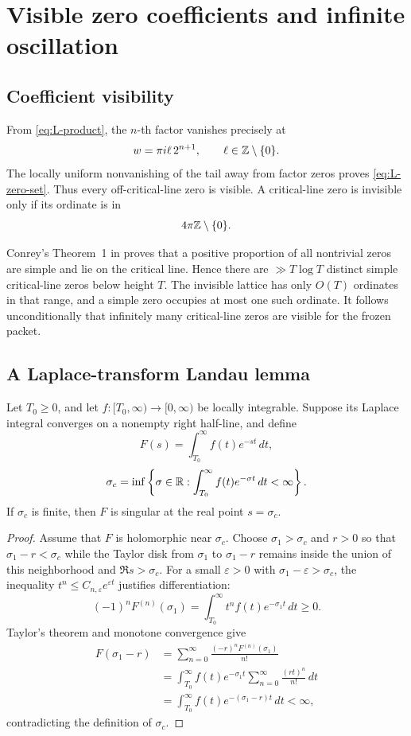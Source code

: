 \section{Visible zero coefficients and infinite oscillation}
\label{sec:oscillation}

\subsection{Coefficient visibility}

From \eqref{eq:L-product}, the \(n\)-th factor vanishes precisely at
\[
w=\pi i\ell\,2^{n+1},\qquad \ell\in\mathbb Z\setminus\{0\}.
\]
The locally uniform nonvanishing of the tail away from factor zeros proves
\eqref{eq:L-zero-set}.  Thus every off-critical-line zero is visible.  A
critical-line zero is invisible only if its ordinate is in
\[
4\pi\mathbb Z\setminus\{0\}.
\]

Conrey's Theorem~1 in \cite{Conrey1989} proves that a positive proportion
of all nontrivial zeros are simple and lie on the critical line.  Hence
there are \(\gg T\log T\) distinct simple critical-line zeros below height
\(T\).  The invisible lattice has only \(O(T)\) ordinates in that range,
and a simple zero occupies at most one such ordinate.  It follows
unconditionally that infinitely many critical-line zeros are visible for
the frozen packet.

\subsection{A Laplace-transform Landau lemma}

\begin{lemma}[Landau]
\label{lem:landau}
Let \(T_0\ge0\), and let
\(f:[T_0,\infty)\to[0,\infty)\) be locally integrable.  Suppose its Laplace
integral converges on a nonempty right half-line, and define
\[
F(s)=\int_{T_0}^{\infty}f(t)e^{-st}\,dt,
\]
\[
\sigma_c=
\inf\left\{
\sigma\in\mathbb R:
\int_{T_0}^{\infty}f(t)e^{-\sigma t}\,dt<\infty
\right\}.
\]
If \(\sigma_c\) is finite, then \(F\) is singular at the real point
\(s=\sigma_c\).
\end{lemma}

\begin{proof}
Assume that \(F\) is holomorphic near \(\sigma_c\).  Choose
\(\sigma_1>\sigma_c\) and \(r>0\) so that
\(\sigma_1-r<\sigma_c\) while the Taylor disk from \(\sigma_1\) to
\(\sigma_1-r\) remains inside the union of this neighborhood and
\(\Re s>\sigma_c\).  For a small \(\varepsilon>0\) with
\(\sigma_1-\varepsilon>\sigma_c\), the inequality
\(t^n\le C_{n,\varepsilon}e^{\varepsilon t}\) justifies differentiation:
\[
(-1)^nF^{(n)}(\sigma_1)
=\int_{T_0}^{\infty}t^nf(t)e^{-\sigma_1t}\,dt\ge0.
\]
Taylor's theorem and monotone convergence give
\begin{align*}
F(\sigma_1-r)
&=
\sum_{n=0}^{\infty}
\frac{(-r)^nF^{(n)}(\sigma_1)}{n!}\\
&=
\int_{T_0}^{\infty}
f(t)e^{-\sigma_1t}
\sum_{n=0}^{\infty}\frac{(rt)^n}{n!}\,dt\\
&=
\int_{T_0}^{\infty}
f(t)e^{-(\sigma_1-r)t}\,dt<\infty,
\end{align*}
contradicting the definition of \(\sigma_c\).
\end{proof}

